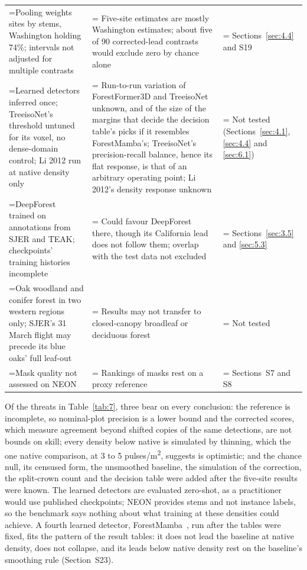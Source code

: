 \documentclass[journal]{IEEEtran}
\begin{document}
\begin{table}[!tp]
\begin{tabularx}{\textwidth}{>{\hsize\linewidth=\hsize}L>{\hsize\linewidth=\hsize}L>{\hsize\linewidth=\hsize}L}
Pooling weights sites by stems, Washington holding 74\%; intervals not adjusted for multiple contrasts & Five-site estimates are mostly Washington estimates; about five of 90 corrected-lead contrasts would exclude zero by chance alone & Sections~\ref{sec:4.4} and S19 \\
Learned detectors inferred once; TreeisoNet's threshold untuned for its voxel, no dense-domain control; Li 2012 run at native density only & Run-to-run variation of ForestFormer3D and TreeisoNet unknown, and of the size of the margins that decide the decision table's picks if it resembles ForestMamba's; TreeisoNet's precision-recall balance, hence its flat response, is that of an arbitrary operating point; Li 2012's density response unknown & Not tested (Sections~\ref{sec:4.1}, \ref{sec:4.4} and \ref{sec:6.1}) \\
DeepForest trained on annotations from SJER and TEAK; checkpoints' training histories incomplete & Could favour DeepForest there, though its California lead does not follow them; overlap with the test data not excluded & Sections~\ref{sec:3.5} and \ref{sec:5.3} \\
Oak woodland and conifer forest in two western regions only; SJER's 31 March flight may precede its blue oaks' full leaf-out & Results may not transfer to closed-canopy broadleaf or deciduous forest & Not tested \\
Mask quality not assessed on NEON & Rankings of masks rest on a proxy reference & Sections~S7 and S8 \\
\hline
\end{tabularx}
\end{table}

Of the threats in Table~\ref{tab:7}, three bear on every conclusion: the reference is
incomplete, so nominal-plot precision is a lower bound and the corrected scores,
which measure agreement beyond shifted copies of the same detections, are not
bounds on skill; every density below native is simulated by thinning, which the
one native comparison, at 3 to 5 pulses/m\textsuperscript{2}, suggests is optimistic; and the
chance null, its censused form, the unsmoothed baseline, the simulation of the
correction, the split-crown count and the decision table were added after the
five-site results were known. The learned detectors are
evaluated zero-shot, as a practitioner would use published checkpoints; NEON
provides stems and not instance labels, so the benchmark says nothing about what
training at these densities could achieve. A fourth learned detector,
ForestMamba~\cite{nguyen2026forestmamba}, run after the tables were fixed, fits the
pattern of the result tables: it does not lead the baseline at native density,
does not collapse, and its leads below native density rest on the baseline's
smoothing rule (Section~S23).
\end{document}
